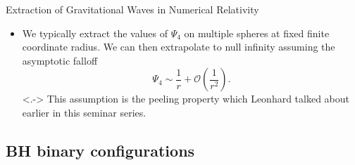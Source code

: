 \documentclass[smaller,aspectratio=169]{beamer}
\begin{document}
\begin{frame}{Extraction of Gravitational Waves in Numerical Relativity}
\begin{itemize}
    \item<+->
        We typically extract the values of $\Psi_4$ on multiple spheres at 
        fixed finite coordinate radius. We can then extrapolate to null 
        infinity assuming the asymptotic falloff
        \begin{equation}
            \Psi_4 \sim \frac{1}{r} + \mathcal{O}\left(\frac{1}{r^2}\right).
        \end{equation}
    \note[item]<.->{
        This assumption is the peeling property which Leonhard talked about
        earlier in this seminar series.}
    \end{itemize}
\end{frame}


\subsection{BH binary configurations}
\end{document}
